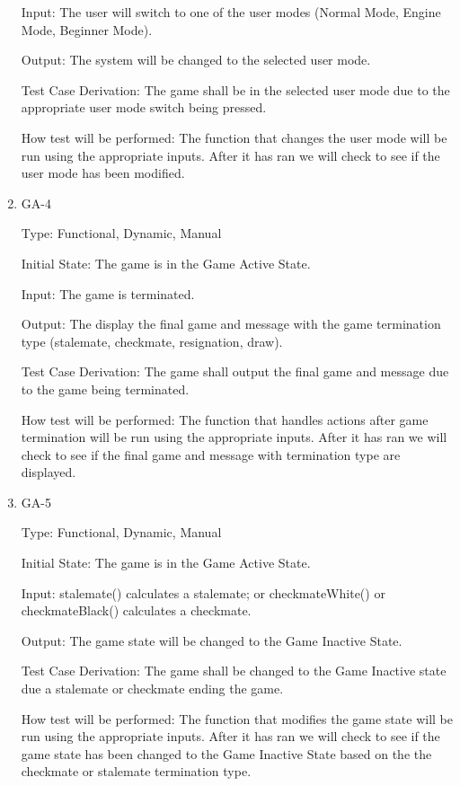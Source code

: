 \documentclass[12pt, titlepage]{article}
\begin{document}
\begin{enumerate}
  Input: The user will switch to one of the user modes (Normal Mode, Engine Mode, Beginner Mode).
  
  Output: The system will be changed to the selected user mode.
                      
  Test Case Derivation: The game shall be in the selected user mode due to the appropriate user mode switch being pressed.
  
  How test will be performed: The function that changes the user mode will be run using the appropriate inputs.
  After it has ran we will check to see if the user mode has been modified.
  
  \item{GA-4\\}

  Type: Functional, Dynamic, Manual
                        
  Initial State: The game is in the Game Active State.
                      
  Input: The game is terminated.
                      
  Output: The display the final game and message with the game termination type (stalemate,
  checkmate, resignation, draw).
                      
  Test Case Derivation: The game shall output the final game and message due to the game being terminated.
  
  How test will be performed: The function that handles actions after game termination will be run using the appropriate inputs.
  After it has ran we will check to see if the final game and message with termination type are displayed.
  
  \item{GA-5\\}
  
  Type: Functional, Dynamic, Manual
                      
  Initial State: The game is in the Game Active State.
                      
  Input: stalemate() calculates a stalemate; or checkmateWhite() or checkmateBlack() calculates a checkmate.
  
  Output: The game state will be changed to the Game Inactive State.
                      
  Test Case Derivation: The game shall be changed to the Game Inactive state due a stalemate or checkmate ending the game.
  
  How test will be performed: The function that modifies the game state will be run using the appropriate inputs.
  After it has ran we will check to see if the game state has been changed to the Game Inactive State based on the
  the checkmate or stalemate termination type.
  
  \end{enumerate}
  
\end{document}
